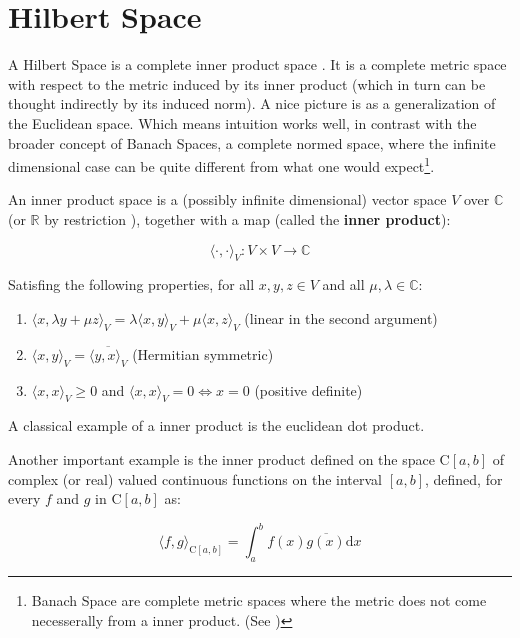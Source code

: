 
\section{Hilbert Space}
\label{s:hilbert}
A Hilbert Space is a complete inner product space \cite{HS-YN:11}. It is a
complete metric space with respect to the metric induced by its inner product
(which in turn can be thought indirectly by its induced norm). A nice picture
is as a generalization of the Euclidean space. Which means intuition works well,
in contrast with the broader concept of Banach Spaces, a complete normed space,
where the infinite dimensional case can be quite different from what one would
expect\footnote{Banach Space are complete metric spaces where the metric does
not come necesserally from a inner product. (See \citet{HS-HJNB:00})}.

An inner product space\cite{HS-HJNB:00} is a (possibly infinite dimensional)
vector space $V$ over $\mathbb{C}$ (or $\mathbb{R}$ by restriction ), together
with a map (called the \textbf{inner product}):

\[  \langle\cdot,\cdot\rangle_{\scriptscriptstyle V}: V \times V \to \mathbb{C}
\]

Satisfing the following properties, for all $x,y,z \in V$ and all $\mu, \lambda
\in \mathbb{C}$:

\begin{enumerate}[I]
  \item \(  \langle x,\lambda y + \mu z  \rangle_{\scriptscriptstyle V} = \lambda\langle	
  x,y\rangle_ {\scriptscriptstyle V} + \mu \langle x,z \rangle_{\scriptscriptstyle V} \) (linear in the second argument)
  \item \( \langle x,y \rangle_{\scriptscriptstyle V} = \overline{\langle y,x \rangle_{\scriptscriptstyle V} } \)
  (Hermitian symmetric)
  \item  \( \langle x,x \rangle_{\scriptscriptstyle V} \geq 0 \) and \( \langle x,x \rangle_{\scriptscriptstyle V} = 0
  \Leftrightarrow x = 0 \) (positive definite)
\end{enumerate}

A classical example of a inner product is the euclidean dot product.

Another important example is the inner product defined on the space C$[a,b]$ of
complex (or real) valued continuous functions on the interval $[a,b]$, defined,
for every $f$ and $g$ in C$[a,b]$ as:

\begin{equation}\label{eq::func_inner}
  \langle f,g\rangle_{\scriptscriptstyle \text{C}[a,b]} = \int_a^b
  f(x)\overline{g(x)} \mathrm{d}x
\end{equation}

